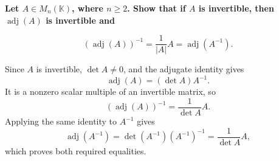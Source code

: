 \providecommand{\rank}{\operatorname{r}}
\providecommand{\RR}{\mathbb R}
\providecommand{\CC}{\mathbb C}
\providecommand{\KK}{\mathbb K}

\setcounter{enumi}{56}
\item {\bfseries\boldmath
Let $A\in M_n(\KK)$, where $n\ge2$. Show that if $A$ is invertible, then $\operatorname{adj}(A)$ is invertible and
}

\[
(\operatorname{adj}(A))^{-1}=\frac1{|A|}A=\operatorname{adj}(A^{-1}).
\]

\begin{answer}
Since $A$ is invertible, $\det A\ne0$, and the adjugate identity gives
\[
 \operatorname{adj}(A)=(\det A)A^{-1}.
\]
It is a nonzero scalar multiple of an invertible matrix, so
\[
 (\operatorname{adj}(A))^{-1}=\frac1{\det A}A.
\]
Applying the same identity to $A^{-1}$ gives
\[
 \operatorname{adj}(A^{-1})=\det(A^{-1})(A^{-1})^{-1}
 =\frac1{\det A}A,
\]
which proves both required equalities.
\end{answer}
